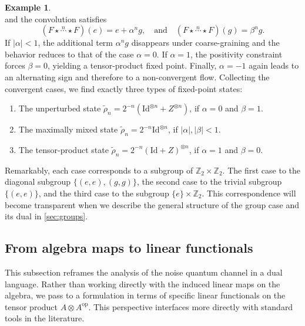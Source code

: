 \documentclass[a4paper,10pt]{amsart}
\theoremstyle{definition}
\newtheorem{example}[theorem]{Example}
\begin{document}
\begin{example}
\[    \]
    and the convolution satisfies
    \[
        (F \star \overset{n}\cdots \star F)(e) = e + \alpha^n g,
        \quad
    \text{and}
    \quad
        (F \star \overset{n}\cdots \star F)(g) = \beta^n g.
    \]
    If $|\alpha|<1$, the additional term $\alpha^n g$ disappears under coarse-graining and the behavior reduces to that of the case $\alpha=0$.
    If $\alpha=1$, the positivity constraint forces $\beta=0$,
    yielding a tensor-product fixed point.
    Finally, $\alpha=-1$ again leads to an alternating sign and therefore to a non-convergent flow.
	\smallbreak\noindent%
    Collecting the convergent cases, we find exactly three types of fixed-point states:
\begin{enumerate}[leftmargin=60pt,itemsep=2pt]
        \item[Case 1:] The unperturbed state
            $\tilde\rho_n = 2^{-n}(\mathrm{Id}^{\otimes n}+Z^{\otimes n})$,
            if $\alpha=0$ and $\beta=1$.
        \item[Case 2:] The maximally mixed state
            $\tilde\rho_n = 2^{-n}\mathrm{Id}^{\otimes n}$,
            if $|\alpha|,|\beta|<1$.
        \item[Case 3:] The tensor-product state
            $\tilde\rho_n = 2^{-n}(\mathrm{Id}+Z)^{\otimes n}$,
            if $\alpha=1$ and $\beta=0$.
    \end{enumerate}
Remarkably, each case corresponds to a subgroup of $\mathbb{Z}_2\times \mathbb{Z}_2$. The first case to the diagonal subgroup $\{(e,e),(g,g)\}$, the second case to the trivial subgroup $\{(e,e)\}$, and the third case to the subgroup $\{e\}\times\mathbb{Z}_2$. This correspondence will become transparent when we describe the general structure of the group case and its dual in \cref{sec:groups}.
\end{example}

\subsection{From algebra maps to linear functionals}

This subsection reframes the analysis of the noise quantum channel in a dual language.
Rather than working directly with the induced linear maps on the algebra, we pass to a formulation in terms of specific linear functionals on the tensor product $A\otimes A^{\mathrm{op}}$.
This perspective interfaces more directly with standard tools in the literature.
\end{document}
